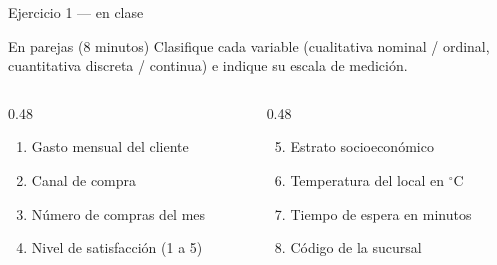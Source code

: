\documentclass[aspectratio=169,10pt]{beamer}
\begin{document}
\begin{frame}{Ejercicio 1 — en clase}
  \begin{alertblock}{En parejas (8 minutos)}
    Clasifique cada variable (cualitativa nominal / ordinal, cuantitativa
    discreta / continua) e indique su escala de medición.

    \vspace{0.25cm}
    \begin{columns}[T,onlytextwidth]
      \begin{column}{0.48\textwidth}
        \begin{enumerate}
          \item Gasto mensual del cliente
          \item Canal de compra
          \item Número de compras del mes
          \item Nivel de satisfacción (1 a 5)
        \end{enumerate}
      \end{column}
      \begin{column}{0.48\textwidth}
        \begin{enumerate}
          \setcounter{enumi}{4}
          \item Estrato socioeconómico
          \item Temperatura del local en $^\circ$C
          \item Tiempo de espera en minutos
          \item Código de la sucursal
        \end{enumerate}
      \end{column}
    \end{columns}
  \end{alertblock}
\end{frame}
\end{document}
